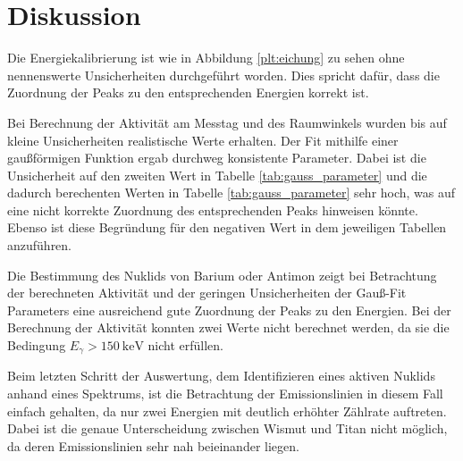 \section{Diskussion}
\label{sec:Diskussion}
Die Energiekalibrierung ist wie in Abbildung \ref{plt:eichung}
zu sehen ohne nennenswerte Unsicherheiten durchgeführt worden. Dies spricht
dafür, dass die Zuordnung der Peaks zu den entsprechenden Energien korrekt ist.

Bei Berechnung der Aktivität am Messtag und des Raumwinkels wurden bis auf kleine
Unsicherheiten realistische Werte erhalten. Der Fit mithilfe einer gaußförmigen
Funktion ergab durchweg konsistente Parameter. Dabei ist die Unsicherheit auf
den zweiten Wert in Tabelle \ref{tab:gauss_parameter} und die dadurch
berechenten Werten in Tabelle \ref{tab:gauss_parameter} sehr hoch, was auf eine
nicht korrekte Zuordnung des entsprechenden Peaks hinweisen könnte. Ebenso ist
diese Begründung für den negativen Wert in dem jeweiligen Tabellen
anzuführen.

Die Bestimmung des Nuklids von Barium oder Antimon zeigt bei Betrachtung der
berechneten Aktivität und der geringen Unsicherheiten der Gauß-Fit Parameters
eine ausreichend gute Zuordnung der Peaks zu den Energien. Bei der Berechnung
der Aktivität konnten zwei Werte nicht berechnet werden, da sie die Bedingung
$E_\gamma > \SI{150}{\kilo\electronvolt}$ nicht erfüllen.

Beim letzten Schritt der Auswertung, dem Identifizieren eines aktiven Nuklids
anhand eines Spektrums, ist die Betrachtung der Emissionslinien in diesem Fall
einfach gehalten, da nur zwei Energien mit deutlich erhöhter Zählrate auftreten.
Dabei ist die genaue Unterscheidung zwischen Wismut und Titan nicht möglich, da
deren Emissionslinien sehr nah beieinander liegen.
